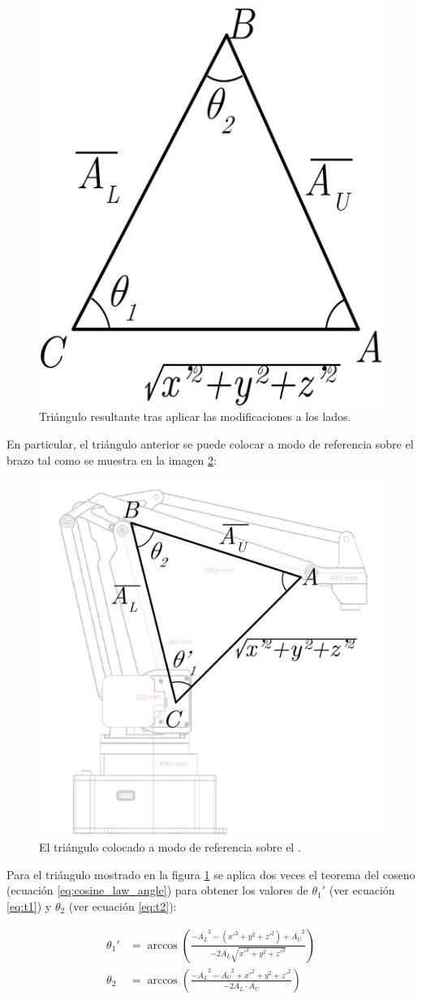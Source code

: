 \begin{figure}[H]
    \centering
    \includegraphics[width=.4\linewidth]{pictures/ik_unitary_triangle.png}
    \caption{Triángulo resultante tras aplicar las modificaciones a los lados.}
    \label{fig:ik_triangle}
\end{figure}

En particular, el triángulo anterior se puede colocar a modo de
referencia sobre el brazo tal como se muestra en la imagen \ref{fig:u_triangle_over_arm}:

\begin{figure}[H]
    \centering
    \includegraphics[width=.6\linewidth]{pictures/ik_triangle_over_arm.png}
    \caption{El triángulo colocado a modo de referencia sobre el \pArm{}.}
    \label{fig:u_triangle_over_arm}
\end{figure}

Para el triángulo mostrado en la figura \ref{fig:ik_triangle} se aplica
dos veces el teorema del coseno (ecuación \ref{eq:cosine_law_angle}) para obtener
los valores de $\theta_1'$ (ver ecuación \ref{eq:t1}) y $\theta_2$ (ver ecuación \ref{eq:t2}):

\begin{align}
    \theta_1' & = \arccos{\left(\frac{-\overline{A_L}^2 - \left(x'^2 + y^2 + z'^2\right) + \overline{A_U}^2} %
    {-2 \overline{A_L} \sqrt{x'^2 + y^2 + z'^2}}\right)} \label{eq:t1}                                       \\[2ex]
    \theta_2  & = \arccos{\left(\frac{-\overline{A_L}^2 - \overline{A_U}^2 + x'^2 + y^2 + z'^2}              %
        {-2 \overline{A_L} \cdot \overline{A_U}}\right)} \label{eq:t2}
\end{align}

